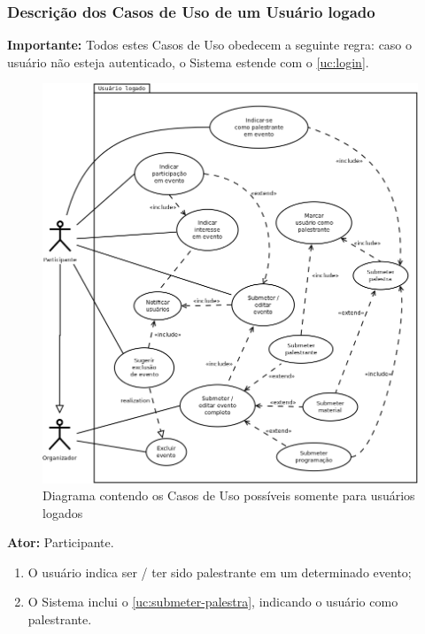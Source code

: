 \documentclass[12pt,a4paper,twoside,hyphens,english,brazil]{abntex2}
\begin{document}
{\subsubsection{Descrição dos Casos de Uso de um Usuário logado} \label{sec:uc-logado}
\textbf{Importante:} Todos estes Casos de Uso obedecem a seguinte regra: caso o usuário não esteja autenticado, o Sistema estende com o \ref{uc:login}.

\begin{figure}[!ht]
\centering
	\includegraphics[width=1\linewidth]{diagramas/uc-logado.png}
	\caption{Diagrama contendo os Casos de Uso possíveis somente para usuários logados}
	\label{diag:uc-logado}
\end{figure}

\textbf{Ator:} Participante.
\begin{enumerate}[itemsep=-1ex,topsep=-1ex]
	\item O usuário indica ser / ter sido palestrante em um determinado evento;
	\item O Sistema inclui o \ref{uc:submeter-palestra}, indicando o usuário como palestrante.
\end{enumerate}

}
\end{document}
